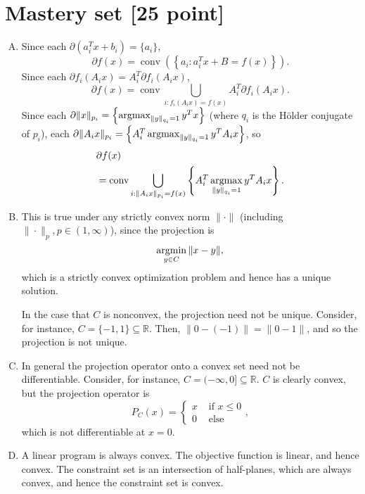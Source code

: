 \documentclass[11pt]{article}
\newcommand{\R}{\mathbb{R}}
\newcommand{\argmin}{\operatornamewithlimits{argmin}}   %
\newcommand{\argmax}{\operatornamewithlimits{argmax}}   %
\newcommand{\conv}{{\operatorname{conv}}}   %
\begin{document}
\twocolumn

\section{Mastery set [25 point]}
\begin{enumerate}[A.]
\item Since each $\partial (a_i^T x + b_i) = \{a_i\}$,
\[\partial f(x)
    = \conv \left( \left\{ a_i : a_i^Tx + B = f(x) \right\} \right).
\]
Since each $\partial f_i(A_ix) = A_i^T \partial f_i(A_ix)$,
\[\partial f(x)
    = \conv \bigcup_{i : f_i(A_ix) = f(x)} A_i^T \partial f_i(A_ix).
\]
Since each $\partial \|x\|_{p_i}
    = \left\{\argmax_{\|y\|_{q_i} = 1} y^Tx \right\}$
(where $q_i$ is the H\"older conjugate of $p_i$), each
$\partial \|A_ix\|_{p_i}
    = \left\{ A_i^T \argmax_{\|y\|_{q_i} = 1} y^TA_ix \right\}$,
so
\begin{align*}
 & \partial f(x)   \\
 &  = \conv \bigcup_{i : \|A_ix\|_{p_i} = f(x)}
            \left\{ A_i^T \argmax_{\|y\|_{q_i} = 1} y^TA_ix \right\}.
\end{align*}
 
\item This is true under any strictly convex norm $\|\cdot\|$ (including
$\|\cdot\|_p, p \in (1,\infty)$), since the projection is
\[\argmin_{y \in C} \|x - y\|,\]
which is a strictly convex optimization problem and hence has a unique
solution.

In the case that $C$ is nonconvex, the projection need not be unique. Consider,
for instance, $C = \{-1,1\} \subseteq \R$. Then, $\|0 - (-1)\| = \|0 - 1\|$,
and so the projection is not unique.
 
\item In general the projection operator onto a convex set need not be
differentiable. Consider, for instance, $C = (-\infty,0] \subseteq \R$. $C$ is
clearly convex, but the projection operator is
\[P_C(x)
    = \left\{
        \begin{array}{ll}
            x   &   \mbox{ if } x \leq 0   \\
            0   &   \mbox{ else }
        \end{array}
    \right.,
\]
which is not differentiable at $x = 0$.
 
\item A linear program is always convex. The objective function is linear, and
hence convex. The constraint set is an intersection of half-planes, which are
always convex, and hence the constraint set is convex.
 

\end{enumerate}
\end{document}
